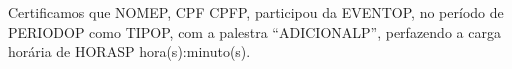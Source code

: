 Certificamos que NOMEP, CPF CPFP, participou da EVENTOP, no período de PERIODOP como TIPOP, com a palestra ``ADICIONALP'', perfazendo a carga horária de HORASP hora(s):minuto(s).
